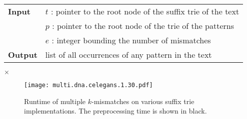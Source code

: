 \begin{figure*}[b]
\begin{center}
\begin{minipage}[t]{.8\textwidth}
\begin{algorithm}[H]
\begin{tabular}{ll}
\textbf{Input}  & $t$ : pointer to the root node of the suffix trie of the text\\
 			    & $p$ : pointer to the root node of the trie of the patterns\\
 			    & $e$ : integer bounding the number of mismatches\\
\textbf{Output} & list of all occurrences of any pattern in the text\\
\end{tabular}
\begin{algorithmic}[1]
		\State \Report {} $\times$ 
		\Repeat
			\Repeat
				\State {}
	\EndIf
\EndIf
\end{algorithmic}
\label{alg:st-hamming-multi}
\end{algorithm}
\end{minipage}
\end{center}
\end{figure*}

\begin{figure}[t]
\begin{center}
\caption[Multiple $k$-mismatches runtime]{Runtime of multiple $k$-mismatches on various suffix trie implementations. The preprocessing time is shown in black.}
\label{fig:query-dna-apx-multi}
\texttt{[image: multi.dna.celegans.1.30.pdf]}
\end{center}
\end{figure}

